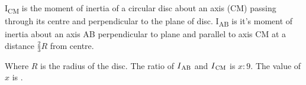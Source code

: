 \item I\textsubscript{CM} is the moment of inertia of a circular disc about an axis (CM) passing through its centre and perpendicular to the plane of disc. I\textsubscript{AB} is it's moment of inertia about an axis AB perpendicular to plane and parallel to axis CM at a distance $\frac{2}{3}R$ from centre.

Where \( R \) is the radius of the disc. The ratio of \( I\textsubscript{AB} \) and \( I\textsubscript{CM} \) is \( x : 9 \). The value of \( x \) is \underline{\hspace{2.5cm}}.
    \begin{center}
    \end{center}